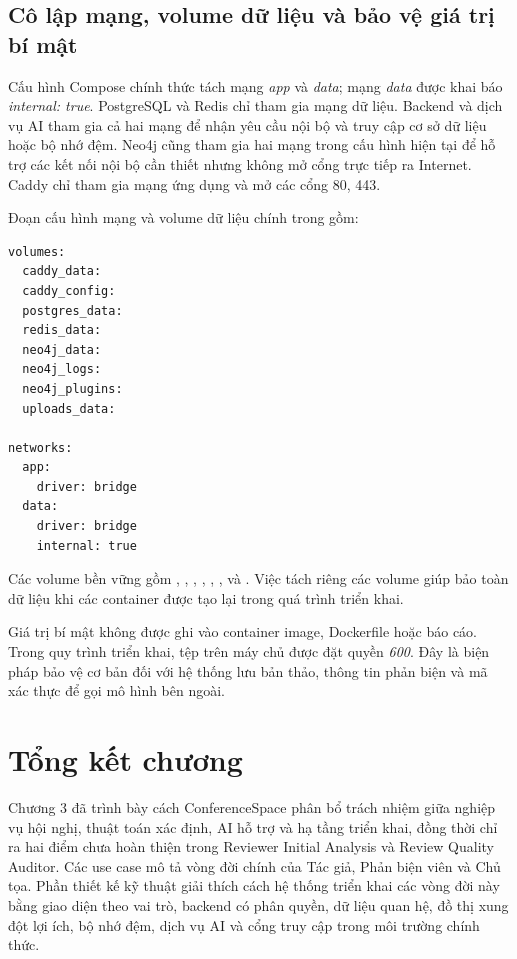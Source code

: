 \subsection{Cô lập mạng, volume dữ liệu và bảo vệ giá trị bí mật}

Cấu hình Compose chính thức tách mạng \textit{app} và \textit{data}; mạng \textit{data} được khai báo \textit{internal: true}. PostgreSQL và Redis chỉ tham gia mạng dữ liệu. Backend và dịch vụ AI tham gia cả hai mạng để nhận yêu cầu nội bộ và truy cập cơ sở dữ liệu hoặc bộ nhớ đệm. Neo4j cũng tham gia hai mạng trong cấu hình hiện tại để hỗ trợ các kết nối nội bộ cần thiết nhưng không mở cổng trực tiếp ra Internet. Caddy chỉ tham gia mạng ứng dụng và mở các cổng 80, 443.

Đoạn cấu hình mạng và volume dữ liệu chính trong  gồm:

\begin{lstlisting}
volumes:
  caddy_data:
  caddy_config:
  postgres_data:
  redis_data:
  neo4j_data:
  neo4j_logs:
  neo4j_plugins:
  uploads_data:

networks:
  app:
    driver: bridge
  data:
    driver: bridge
    internal: true
\end{lstlisting}

Các volume bền vững gồm , , , , , ,  và . Việc tách riêng các volume giúp bảo toàn dữ liệu khi các container được tạo lại trong quá trình triển khai.

Giá trị bí mật không được ghi vào container image, Dockerfile hoặc báo cáo. Trong quy trình triển khai, tệp  trên máy chủ được đặt quyền \textit{600}. Đây là biện pháp bảo vệ cơ bản đối với hệ thống lưu bản thảo, thông tin phản biện và mã xác thực để gọi mô hình bên ngoài.

\section{Tổng kết chương}

Chương 3 đã trình bày cách ConferenceSpace phân bổ trách nhiệm giữa nghiệp vụ hội nghị, thuật toán xác định, AI hỗ trợ và hạ tầng triển khai, đồng thời chỉ ra hai điểm chưa hoàn thiện trong Reviewer Initial Analysis và Review Quality Auditor. Các use case mô tả vòng đời chính của Tác giả, Phản biện viên và Chủ tọa. Phần thiết kế kỹ thuật giải thích cách hệ thống triển khai các vòng đời này bằng giao diện theo vai trò, backend có phân quyền, dữ liệu quan hệ, đồ thị xung đột lợi ích, bộ nhớ đệm, dịch vụ AI và cổng truy cập trong môi trường chính thức.

